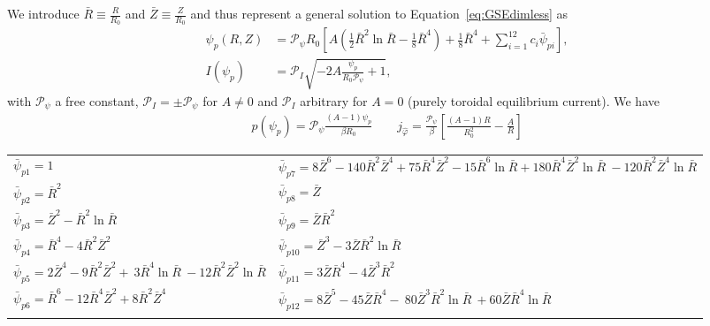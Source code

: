 We introduce \(\bar{R} \equiv \frac{R}{R_0}\) and \(\bar{Z} \equiv\frac{Z}{R_0}\)
and thus represent a general solution to Equation~\eqref{eq:GSEdimless} as~\cite{Cerfon2010}
\begin{subequations}
\label{eq:solovev}
\begin{align}
 \psi_p (R,Z) &= \mathcal P_{\psi} R_0 \left[ A\left( \frac{1}{2} \bar{R}^2 \ln{\bar{R}}
   - \frac{1}{8}\bar{R}^4\right)+ \frac{1}{8}\bar{R}^4
   + \sum_{i=1}^{12} c_{i}  \bar{\psi}_{pi}\right],\\
   I(\psi_p) &= \mathcal P_I\sqrt{ - 2A\frac{\psi_p}{R_0\mathcal P_{\psi}} +1},
\end{align}
\end{subequations}
with $\mathcal P_\psi$ a free constant, $\mathcal P_I = \pm \mathcal P_\psi$ for $A\neq 0$ and $\mathcal P_I$ arbitrary for $A=0$ (purely toroidal equilibrium current).
We have
\begin{align}
    p(\psi_p) = \mathcal P_\psi \frac{( A-1)\psi_p}{\beta R_0 } \qquad
    j_{\hat\varphi} = \frac{\mathcal P_\psi}{\beta } \left[\frac{(A-1)R}{R_0^2} - \frac{A}{R}\right]
\end{align}
\begin{longtable}{>{\RaggedRight}p{7cm}>{\RaggedRight}p{7cm}}
\toprule
  $\bar{\psi}_{p1}=1$
  & $\bar{\psi}_{p7}=8\bar{Z}^6 -140 \bar{R}^2 \bar{Z}^4
                      + 75 \bar{R}^4 \bar{Z}^2 - 15\bar{R}^6\ln{\bar{R}}+ 180 \bar{R}^4 \bar{Z}^2 \ln{\bar{R}} \
                       -120 \bar{R}^2 \bar{Z}^4 \ln{\bar{R}}$\\
%
  $\bar{\psi}_{p2}=\bar{R}^2$ &
  $\bar{\psi}_{p8}=\bar{Z}$ \\
%
  $\bar{\psi}_{p3}=\bar{Z}^2 - \bar{R}^2 \ln{\bar{R}}$ &
  $\bar{\psi}_{p9}=\bar{Z}  \bar{R}^2$\\
%
  $\bar{\psi}_{p4}=\bar{R}^4 -4\bar{R}^2\bar{Z}^2$ &
  $\bar{\psi}_{p10}=\bar{Z}^3 - 3 \bar{Z} \bar{R}^2 \ln{\bar{R}}$\\
  $\bar{\psi}_{p5}=2\bar{Z}^4 - 9 \bar{R}^2\bar{Z}^2 + \
                     3 \bar{R}^4 \ln{\bar{R}} \
                    -12  \bar{R}^2\bar{Z}^2 \ln{\bar{R}}$
  &
$\bar{\psi}_{p11}=3 \bar{Z}\bar{R}^4 - 4\bar{Z}^3\bar{R}^2$\\
%
  $\bar{\psi}_{p6}=\bar{R}^6 -12 \bar{R}^4 \bar{Z}^2
                     + 8  \bar{R}^2 \bar{Z}^4$ &
  $\bar{\psi}_{p12}= 8 \bar{Z}^5 -45 \bar{Z} \bar{R}^4 - \
                       80 \bar{Z}^3 \bar{R}^2\ln{\bar{R}} \
                       +60 \bar{Z} \bar{R}^4\ln{\bar{R}}$ \\
   & \\
\bottomrule
\end{longtable}
